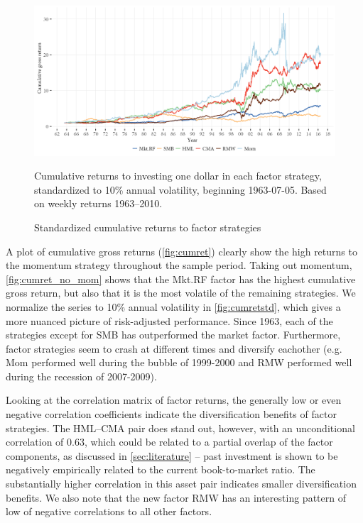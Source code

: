 \begin{figure}[htbp]
  \centering
  \includegraphics[scale=1]{graphics/cumretStdPlot.png}  
  \footnotesize
  \caption{Standardized cumulative returns to factor strategies}
  \begin{longcaption}
    Cumulative returns to investing one dollar in each factor strategy, standardized to 10\% annual volatility, beginning 1963-07-05. Based on weekly returns 1963--2010.
  \end{longcaption}
  \label{fig:cumretstd}
\end{figure}

A plot of cumulative gross returns (\autoref{fig:cumret}) clearly show the high returns to the momentum strategy throughout the sample period. Taking out momentum, \autoref{fig:cumret_no_mom} shows that the Mkt.RF factor has the highest cumulative gross return, but also that it is the most volatile of the remaining strategies. We normalize the series to 10\% annual volatility in \autoref{fig:cumretstd}, which gives a more nuanced picture of risk-adjusted performance. Since 1963, each of the strategies except for SMB has outperformed the market factor. Furthermore, factor strategies seem to crash at different times and diversify eachother (e.g. Mom performed well during the bubble of 1999-2000 and RMW performed well during the recession of 2007-2009).

Looking at the correlation matrix of factor returns, the generally low or even negative correlation coefficients indicate the diversification benefits of factor strategies. The HML--CMA pair does stand out, however, with an unconditional correlation of 0.63, which could be related to a partial overlap of the factor components, as discussed in \autoref{sec:literature} -- past investment is shown to be negatively empirically related to the current book-to-market ratio. The substantially higher correlation in this asset pair indicates smaller diversification benefits. We also note that the new factor RMW has an interesting pattern of low of negative correlations to all other factors.
\FloatBarrier

